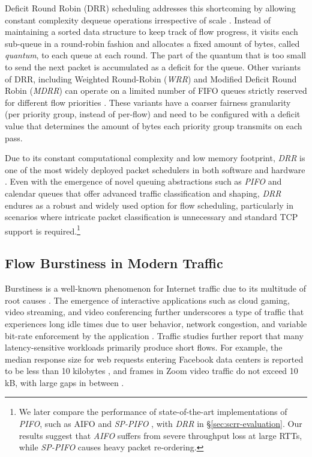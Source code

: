 Deficit Round Robin (DRR) scheduling addresses this shortcoming by
allowing constant complexity dequeue operations irrespective of scale
\cite{drr}. Instead of maintaining a sorted data structure to keep
track of flow progress, it visits each sub-queue in a round-robin
fashion and allocates a fixed amount of bytes, called
\textit{quantum}, to each queue at each round. The part of the quantum
that is too small to send the next packet is accumulated as a deficit
for the queue.
Other variants of DRR, including Weighted Round-Robin (\textit{WRR}) and
Modified Deficit Round Robin (\textit{MDRR}) \cite{cisco} can operate on
a limited number of FIFO queues strictly reserved for different flow
priorities \cite{intel810}. These variants have a coarser fairness
granularity (per priority group, instead of per-flow) and need to be
configured with a deficit value that determines the amount of bytes
each priority group transmits on each pass.

Due to its constant computational complexity and low memory footprint,
\textit{DRR} is one of the most widely deployed packet schedulers in both
software and hardware \cite{drr,loom,cisco,juniper,tc,pifo,intel810,intel710}.
Even with the emergence of novel queuing abstractions such as \textit{PIFO}
\cite{pifo} and calendar queues \cite{calendar} that offer advanced
traffic classification and shaping, \textit{DRR} endures as a robust and widely
used option for flow scheduling, particularly in scenarios where
intricate packet classification is unnecessary
\cite{demi,netchannel,corundum,justitia,sch-fq} and standard TCP
support is required.\footnote{We later compare the performance of
state-of-the-art implementations of \textit{PIFO}, such as AIFO \cite{aifo} and
\textit{SP-PIFO} \cite{sppifo}, with \textit{DRR} in \S\ref{sec:scrr-evaluation}. Our results
suggest that \textit{AIFO} suffers from severe throughput loss at large RTTs,
while \textit{SP-PIFO} causes heavy packet re-ordering.}



\subsection{Flow Burstiness in Modern Traffic}

Burstiness is a well-known phenomenon for Internet traffic due to its multitude of root causes \cite{wild,bullet,why,im,valinor,high-resolution}. The emergence of interactive applications such as cloud gaming, video streaming, and video conferencing further underscores a type of traffic that experiences long idle times due to user behavior, network congestion, and variable bit-rate enforcement by the application \cite{im,movidiff,passive,qoe,gaming}. Traffic studies further report that many latency-sensitive workloads primarily produce short flows. For example, the median response size for web requests entering Facebook data centers is reported to be less than 10 kilobytes \cite{edge}, and frames in Zoom video traffic do not exceed 10 kB, with large gaps in between \cite{passive}. 

